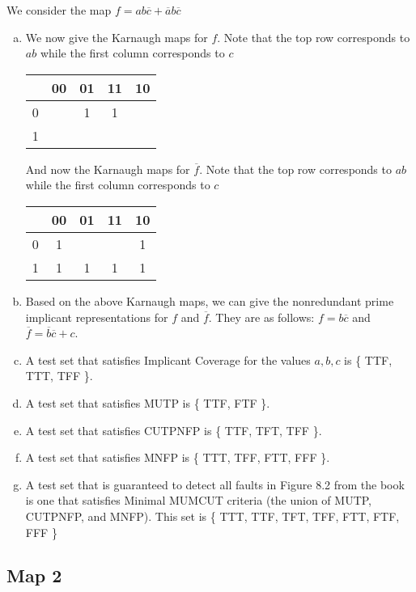 \documentclass{article}
\newcommand{\nota}{\overline{a}}
\newcommand{\notb}{\overline{b}}
\newcommand{\notc}{\overline{c}}
\newcommand{\fbar}{\overline{f}}
\begin{document}
We consider the map $ f = ab \notc + \nota b \notc $
\begin{enumerate}[(a)]
	\item We now give the Karnaugh maps for $f$. Note that the top row corresponds to $ab$ while the first column corresponds to $c$
	\begin{center}
		\begin{tabular}{c||c|c|c|c|}
			  & 00 & 01 & 11 & 10 \\
			\hline
			0 & & 1 & 1 & \\
			\hline
			1 & & & & \\
			\hline
		\end{tabular}
	\end{center}
	And now the Karnaugh maps for $\fbar$. Note that the top row corresponds to $ab$ while the first column corresponds to $c$
	\begin{center}
		\begin{tabular}{c||c|c|c|c|}
			& 00 & 01 & 11 & 10 \\
			\hline
			0 & 1 & & & 1 \\
			\hline
			1 & 1 & 1 & 1 & 1 \\
			\hline
		\end{tabular}
	\end{center}
	\item Based on the above Karnaugh maps, we can give the nonredundant prime implicant representations for $f$ and $\fbar$. They are as follows: $ f = b \notc $ and $ \fbar = \notb \notc + c $.
	\item A test set that satisfies Implicant Coverage for the values $a,b,c$ is \{ TTF, TTT, TFF \}.
	\item A test set that satisfies MUTP is \{ TTF, FTF \}.
	\item A test set that satisfies CUTPNFP is \{ TTF, TFT, TFF \}.
	\item A test set that satisfies MNFP is \{ TTT, TFF, FTT, FFF \}.
	\item A test set that is guaranteed to detect all faults in Figure 8.2 from the book is one that satisfies Minimal MUMCUT criteria (the union of MUTP, CUTPNFP, and MNFP). This set is \{ TTT, TTF, TFT, TFF, FTT, FTF, FFF \}
\end{enumerate}

\subsection*{Map 2}
\end{document}
